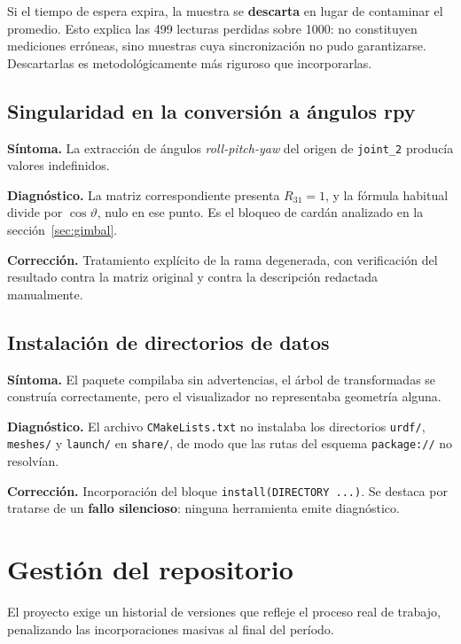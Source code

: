 \documentclass[11pt,a4paper]{article}
\begin{document}
Si el tiempo de espera expira, la muestra se \textbf{descarta} en lugar
de contaminar el promedio. Esto explica las 499 lecturas perdidas sobre
1000: no constituyen mediciones erróneas, sino muestras cuya
sincronización no pudo garantizarse. Descartarlas es metodológicamente
más riguroso que incorporarlas.

\subsection{Singularidad en la conversión a ángulos rpy}

\textbf{Síntoma.} La extracción de ángulos \emph{roll-pitch-yaw} del
origen de \texttt{joint\_2} producía valores indefinidos.

\textbf{Diagnóstico.} La matriz correspondiente presenta $R_{31} = 1$, y
la fórmula habitual divide por $\cos\vartheta$, nulo en ese punto. Es el
bloqueo de cardán analizado en la sección~\ref{sec:gimbal}.

\textbf{Corrección.} Tratamiento explícito de la rama degenerada, con
verificación del resultado contra la matriz original y contra la
descripción redactada manualmente.

\subsection{Instalación de directorios de datos}

\textbf{Síntoma.} El paquete compilaba sin advertencias, el árbol de
transformadas se construía correctamente, pero el visualizador no
representaba geometría alguna.

\textbf{Diagnóstico.} El archivo \texttt{CMakeLists.txt} no instalaba
los directorios \texttt{urdf/}, \texttt{meshes/} y \texttt{launch/} en
\texttt{share/}, de modo que las rutas del esquema \texttt{package://}
no resolvían.

\textbf{Corrección.} Incorporación del bloque
\texttt{install(DIRECTORY ...)}. Se destaca por tratarse de un
\textbf{fallo silencioso}: ninguna herramienta emite diagnóstico.

\section{Gestión del repositorio}

El proyecto exige un historial de versiones que refleje el proceso real
de trabajo, penalizando las incorporaciones masivas al final del
período.
\end{document}
